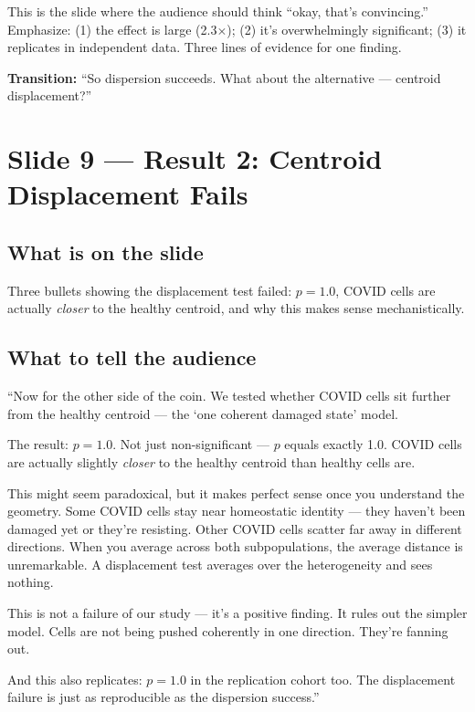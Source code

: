 \documentclass[11pt]{article}
\begin{document}
\begin{resultbox}
This is the slide where the audience should think ``okay, that's convincing.'' Emphasize: (1) the effect is large (2.3$\times$); (2) it's overwhelmingly significant; (3) it replicates in independent data. Three lines of evidence for one finding.
\end{resultbox}

\textbf{Transition:} ``So dispersion succeeds. What about the alternative --- centroid displacement?''


\section{Slide 9 --- Result 2: Centroid Displacement Fails}

\subsection{What is on the slide}

Three bullets showing the displacement test failed: $p = 1.0$, COVID cells are actually \emph{closer} to the healthy centroid, and why this makes sense mechanistically.

\subsection{What to tell the audience}

\begin{speaknote}
``Now for the other side of the coin. We tested whether COVID cells sit further from the healthy centroid --- the `one coherent damaged state' model.

The result: $p = 1.0$. Not just non-significant --- $p$ equals exactly 1.0. COVID cells are actually slightly \emph{closer} to the healthy centroid than healthy cells are.

This might seem paradoxical, but it makes perfect sense once you understand the geometry. Some COVID cells stay near homeostatic identity --- they haven't been damaged yet or they're resisting. Other COVID cells scatter far away in different directions. When you average across both subpopulations, the average distance is unremarkable. A displacement test averages over the heterogeneity and sees nothing.

This is not a failure of our study --- it's a positive finding. It rules out the simpler model. Cells are not being pushed coherently in one direction. They're fanning out.

And this also replicates: $p = 1.0$ in the replication cohort too. The displacement failure is just as reproducible as the dispersion success.''
\end{speaknote}
\end{document}
